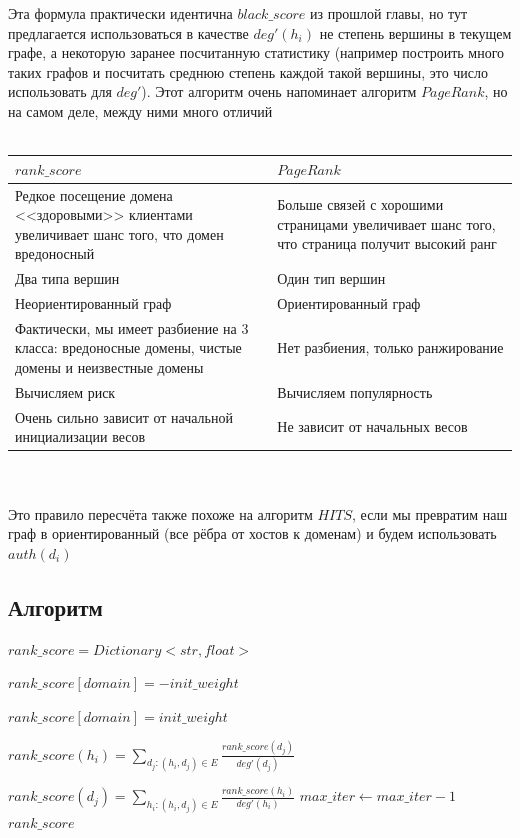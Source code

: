 \documentclass[14pt]{extreport}
\begin{document}
	Эта формула практически идентична $black\_score$ из прошлой главы, но тут предлагается использоваться в качестве $deg'(h_i)$ не степень вершины в текущем графе, а некоторую заранее посчитанную статистику (например построить много таких графов и посчитать среднюю степень каждой такой вершины, это число использовать для $deg'$). Этот алгоритм очень напоминает алгоритм $PageRank$, но на самом деле, между ними много отличий
	\\\\
	\begin{tabular}{|p{8cm}|p{8cm}|}
			\hline
			$rank\_score$ & $PageRank$ \\ \hline
			Редкое посещение домена <<здоровыми>> клиентами увеличивает шанс того, что домен вредоносный & Больше связей с хорошими страницами увеличивает шанс того, что страница получит высокий ранг \\ \hline 
			Два типа вершин &  Один тип вершин \\ \hline
			Неориентированный граф &  Ориентированный граф \\ \hline
			Фактически, мы имеет разбиение на 3 класса: вредоносные домены, чистые домены и неизвестные домены &  Нет разбиения, только ранжирование \\ \hline
			Вычисляем риск &  Вычисляем популярность \\ \hline
			Очень сильно зависит от начальной инициализации весов & Не зависит от начальных весов \\ \hline
	\end{tabular}
	\\ \\
	Это правило пересчёта также похоже на алгоритм $HITS$, если мы превратим наш граф в ориентированный (все рёбра от хостов к доменам) и будем использовать $auth(d_i)$
	
	\subsection{Алгоритм}
		\begin{algorithmic}
	\State $rank\_score = Dictionary<str, float>$
	
		\State $rank\_score[domain] = -init\_weight$
	\EndFor
	
		\State $rank\_score[domain] = init\_weight$
	\EndFor

			\State $rank\_score(h_i) = \sum_{d_j: (h_i, d_j)\in E} \frac{rank\_score(d_j)}{deg'(d_j)}$
		\EndFor
		
			\State $rank\_score(d_j) = \sum_{h_i: (h_i, d_j)\in E} \frac{rank\_score(h_i)}{deg'(h_i)}$
		\EndFor
		\State $max\_iter\gets max\_iter-1$
	\EndWhile
	\State \Return $rank\_score$
	\EndFunction
	\end{algorithmic}
\end{document}
